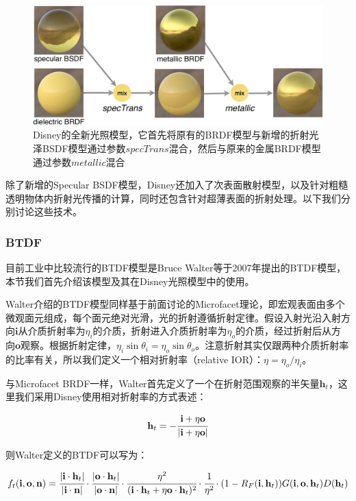 \begin{figure}
	\includegraphics[width=\textwidth]{figures/intro/Disney-bsdf}
	\caption{Disney的全新光照模型，它首先将原有的BRDF模型与新增的折射光泽BSDF模型通过参数$specTrans$混合，然后与原来的金属BRDF模型通过参数$metallic$混合}
	\label{f:intro-Disney-bsdf}
\end{figure}

除了新增的Specular BSDF模型，Disney还加入了次表面散射模型，以及针对粗糙透明物体内折射光传播的计算，同时还包含针对超薄表面的折射处理。以下我们分别讨论这些技术。





\subsubsection{BTDF}
目前工业中比较流行的BTDF模型是Bruce Walter等\cite{a:Microfacetmodelsforrefractionthroughroughsurfaces}于2007年提出的BTDF模型，本节我们首先介绍该模型及其在Disney光照模型中的使用。

Walter介绍的BTDF模型同样基于前面讨论的Microfacet理论，即宏观表面由多个微观面元组成，每个面元绝对光滑，光的折射遵循折射定律。假设入射光沿入射方向$\mathbf{i}$从介质折射率为$\eta_i$的介质，折射进入介质折射率为$\eta_o$的介质，经过折射后从方向$\mathbf{o}$观察。根据折射定律，$\eta_i \sin\theta_i=\eta_o \sin\theta_o$。注意折射其实仅跟两种介质折射率的比率有关，所以我们定义一个相对折射率（relative IOR）：$\eta=\eta_o/\eta_i$。

与Microfacet BRDF一样，Walter首先定义了一个在折射范围观察的半矢量$\mathbf{h}_t$，这里我们采用Disney使用相对折射率的方式表述：

\begin{equation}
	\mathbf{h}_t=- \cfrac{\mathbf{i}+\eta\mathbf{o}}{|\mathbf{i}+\eta\mathbf{o}|}
\end{equation}

\noindent 则Walter定义的BTDF可以写为：

\begin{equation}
	f_t(\mathbf{i},\mathbf{o},\mathbf{n})= \cfrac{|\mathbf{i}\cdot\mathbf{h}_t|}{|\mathbf{i}\cdot\mathbf{n}|}\cdot \cfrac{|\mathbf{o}\cdot\mathbf{h}_t|}{|\mathbf{o}\cdot\mathbf{n}|}\cdot \cfrac{\eta^2}{(\mathbf{i}\cdot\mathbf{h}_t+\eta\mathbf{o}\cdot\mathbf{h}_t)^2}\cdot \cfrac{1}{\eta^2}\cdot (1-R_F(\mathbf{i},\mathbf{h}_t))G(\mathbf{i},\mathbf{o},\mathbf{h}_t)D(\mathbf{h}_t)
\end{equation}

